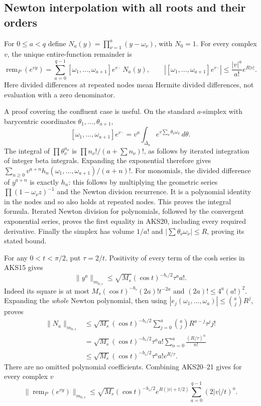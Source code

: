 \subsection{Newton interpolation with all roots and their orders}
For $0\le a<q$ define $N_a(y)=\prod_{\nu=1}^a(y-\omega_\nu)$, with
$N_0=1$. For every complex $v$, the unique entire-function remainder is
\[
 \operatorname{rem}_P(e^{vy})
   =\sum_{a=0}^{q-1}[\omega_1,\ldots,\omega_{a+1}]e^{v\cdot}\ N_a(y),
 \qquad
 \left|[\omega_1,\ldots,\omega_{a+1}]e^{v\cdot}\right|
       \le\frac{|v|^a}{a!}e^{R|v|}.
 \tag{AKS20}
\]
Here divided differences at repeated nodes mean Hermite divided
differences, not evaluation with a zero denominator.

A proof covering the confluent case is useful. On the standard
$a$-simplex with barycentric coordinates $\theta_1,\ldots,\theta_{a+1}$,
\[
 [\omega_1,\ldots,\omega_{a+1}]e^{v\cdot}
       =v^a\int_{\Delta_a}e^{v\sum_\nu\theta_\nu\omega_\nu}\,d\theta.
\]
The integral of $\prod\theta_\nu^{n_\nu}$ is
$\prod n_\nu!/(a+\sum n_\nu)!$, as follows by iterated integration of
integer beta integrals. Expanding the exponential therefore gives
$\sum_{n\ge0}v^{a+n}h_n(\omega_1,\ldots,\omega_{a+1})/(a+n)!$.
For monomials, the divided difference of $y^{a+n}$ is exactly $h_n$:
this follows by multiplying the geometric series
$\prod(1-\omega_\nu z)^{-1}$ and the Newton division recurrence.
It is a polynomial identity in the nodes and so also holds at repeated
nodes. This proves the integral formula. Iterated Newton division for
polynomials, followed by the convergent exponential series, proves the
first equality in AKS20, including every required derivative.
Finally the simplex has volume $1/a!$ and
$|\sum\theta_\nu\omega_\nu|\le R$, proving its stated bound.

For any $0<t<\pi/2$, put $\tau=2/t$. Positivity of every term of the
cosh series in AKS15 gives
\[
 \|y^a\|_{m_{0,s}}
 \le\sqrt{M_s}(\cos t)^{-b_s/2}\tau^a a!.
\]
Indeed its square is at most
$M_s(\cos t)^{-b_s}(2a)!t^{-2a}$ and
$(2a)!\le4^a(a!)^2$. Expanding the \emph{whole} Newton polynomial, then
using $|e_j(\omega_1,\ldots,\omega_a)|\le\binom ajR^j$, proves
\[
\begin{split}
 \|N_a\|_{m_{0,s}}
 &\le\sqrt{M_s}(\cos t)^{-b_s/2}
        \sum_{j=0}^a\binom ajR^{a-j}\tau^j j!\\
 &=\sqrt{M_s}(\cos t)^{-b_s/2}\tau^a a!
           \sum_{n=0}^a\frac{(R/\tau)^n}{n!}\\
 &\le\sqrt{M_s}(\cos t)^{-b_s/2}\tau^a a!e^{R/\tau}.
\end{split}\tag{AKS21}
\]
There are no omitted polynomial coefficients. Combining AKS20--21 gives
for every complex $v$
\[
 \|\operatorname{rem}_P(e^{vy})\|_{m_{0,s}}
 \le\sqrt{M_s}(\cos t)^{-b_s/2}e^{R(|v|+t/2)}
                       \sum_{a=0}^{q-1}(2|v|/t)^a.
 \tag{AKS22}
\]

